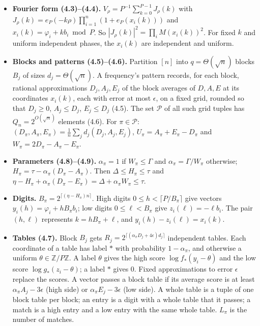 \documentclass[10pt,a4paper]{article}
\begin{document}
\begin{itemize}
\item \textbf{Fourier form (4.3)--(4.4).} $V_\rho = P^{-1}\sum_{k=0}^{P-1}J_\rho(k)$ with
$J_\rho(k) = e_P(-k\rho)\prod_{i=1}^n(1 + e_P(x_i(k)))$ and $x_i(k) = \varphi_i + kb_i \bmod P$. So
$|J_\rho(k)|^2 = \prod_iM(x_i(k))^2$. For fixed $k$ and uniform independent phases, the $x_i(k)$ are independent and
uniform.
\item \textbf{Blocks and patterns (4.5)--(4.6).} Partition $[n]$ into $q = \Theta(\sqrt n)$ blocks $B_j$ of sizes
$d_j = \Theta(\sqrt n)$. A frequency's pattern records, for each block, rational approximations $D_j, A_j, E_j$ of the
block averages of $D, A, E$ at its coordinates $x_i(k)$, each with error at most $\epsilon$, on a fixed grid, rounded so
that $D_j \ge 0$, $A_j \le D_j$, $E_j \le D_j$ (4.5). The set $\mathcal P$ of all such grid tuples has
$Q_n = 2^{O(\sqrt n)}$ elements (4.6). For $\pi \in \mathcal P$: $(D_\pi, A_\pi, E_\pi) = \frac1n\sum_jd_j(D_j, A_j, E_j)$,
$U_\pi = A_\pi + E_\pi - D_\pi$ and $W_\pi = 2D_\pi - A_\pi - E_\pi$.
\item \textbf{Parameters (4.8)--(4.9).} $\alpha_\pi = 1$ if $W_\pi \le \Gamma$ and $\alpha_\pi = \Gamma/W_\pi$ otherwise;
$H_\pi = \tau - \alpha_\pi(D_\pi - A_\pi)$. Then $\Delta \le H_\pi \le \tau$ and
$\eta - H_\pi + \alpha_\pi(D_\pi - E_\pi) = \Delta + \alpha_\pi W_\pi \le \tau$.
\item \textbf{Digits.} $B_\pi = 2^{\lceil(\eta - H_\pi)n\rceil}$. High digits $0 \le h < \lceil P/B_\pi\rceil$ give vectors
$y_i(h) = \varphi_i + hB_\pi b_i$; low digits $0 \le \ell < B_\pi$ give $z_i(\ell) = -\ell b_i$. The pair $(h, \ell)$
represents $k = hB_\pi + \ell$, and $y_i(h) - z_i(\ell) = x_i(k)$.
\item \textbf{Tables (4.7).} Block $B_j$ gets $R_j = 2^{\lceil(\alpha_\pi D_j + 4\epsilon)d_j\rceil}$ independent tables. Each
coordinate of a table has label $*$ with probability $1 - \alpha_\pi$, and otherwise a uniform $\theta \in \mathbb Z/P\mathbb Z$.
A label $\theta$ gives the high score $\log f_*(y_i - \theta)$ and the low score $\log g_*(z_i - \theta)$; a label $*$
gives 0. Fixed approximations to error $\epsilon$ replace the scores. A vector passes a block table if its average
score is at least $\alpha_\pi A_j - 3\epsilon$ (high side) or $\alpha_\pi E_j - 3\epsilon$ (low side). A whole table is
a tuple of one block table per block; an entry is a digit with a whole table that it passes; a match is a high entry
and a low entry with the same whole table. $L_\pi$ is the number of matches.

\end{itemize}
\end{document}
